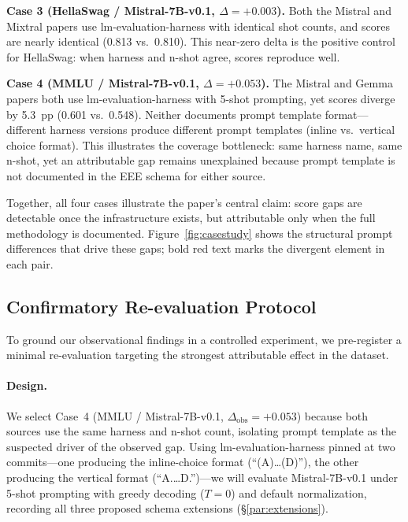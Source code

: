 \documentclass[11pt]{article}
\begin{document}
\textbf{Case 3 (HellaSwag / Mistral-7B-v0.1, $\Delta = +0.003$).}
Both the Mistral \citep{jiang-2023-mistral} and Mixtral
\citep{jiang-2024-mixtral} papers use lm-evaluation-harness with
identical shot counts, and scores are nearly identical (0.813 vs.\ 0.810).
This near-zero delta is the positive control for HellaSwag: when
harness and n-shot agree, scores reproduce well.

\textbf{Case 4 (MMLU / Mistral-7B-v0.1, $\Delta = +0.053$).}
The Mistral and Gemma papers both use lm-evaluation-harness with
5-shot prompting, yet scores diverge by 5.3~pp (0.601 vs.\ 0.548).
Neither documents prompt template format---different harness versions
produce different prompt templates (inline vs.\ vertical choice format).
This illustrates the coverage bottleneck: same harness name, same n-shot,
yet an attributable gap remains unexplained because prompt template
is not documented in the EEE schema for either source.

Together, all four cases illustrate the paper's central claim: score
gaps are detectable once the infrastructure exists, but attributable
only when the full methodology is documented.
Figure~\ref{fig:casestudy} shows the structural prompt differences
that drive these gaps; bold red text marks the divergent element
in each pair.

\subsection{Confirmatory Re-evaluation Protocol}
\label{sec:reeval}

To ground our observational findings in a controlled experiment, we
pre-register a minimal re-evaluation targeting the strongest
attributable effect in the dataset.

\paragraph{Design.}
We select Case~4 (MMLU / Mistral-7B-v0.1, $\Delta_{\text{obs}} = +0.053$)
because both sources use the same harness and n-shot count, isolating
prompt template as the suspected driver of the observed gap.
Using lm-evaluation-harness pinned at two commits---one producing the
inline-choice format (``(A)\ldots(D)''), the other producing the
vertical format (``A.\ldots D.'')---we will evaluate Mistral-7B-v0.1
under 5-shot prompting with greedy decoding ($T\!=\!0$) and default
normalization, recording all three proposed schema extensions
(\S\ref{par:extensions}).
\end{document}
